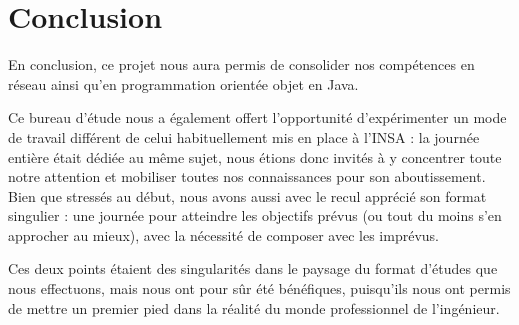 \documentclass[a4paper,11pt]{article}
\let\Oldsection\section
\renewcommand{\section}{\FloatBarrier\Oldsection}
\begin{document}



\section{Conclusion}

En conclusion, ce projet nous aura permis de consolider nos compétences en réseau ainsi qu’en programmation orientée objet en Java. 

Ce bureau d'étude nous a également offert l’opportunité d’expérimenter un mode de travail différent de celui habituellement mis en place à l’INSA : la journée entière était dédiée au même sujet, nous étions donc invités à y concentrer toute notre attention et mobiliser toutes nos connaissances pour son aboutissement.
Bien que stressés au début, nous avons aussi avec le recul apprécié son format singulier : une journée pour atteindre les objectifs prévus (ou tout du moins s’en approcher au mieux), avec la nécessité de composer avec les imprévus. 

Ces deux points étaient des singularités dans le paysage du format d’études que nous effectuons, mais nous ont pour sûr été bénéfiques, puisqu’ils nous ont permis de mettre un premier pied dans la réalité du monde professionnel de l’ingénieur. 


\cleardoublepage
\listoflistings
\listoffigures
\end{document}
